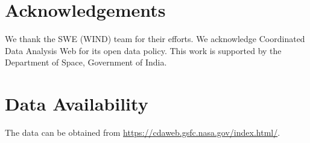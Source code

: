 \documentclass[letters,usenatbib]{mnras}
\begin{document}
\section*{Acknowledgements}

We thank the SWE (WIND) team for their efforts. We acknowledge Coordinated Data Analysis Web for its open data policy. This work is supported by the Department of Space, Government of India.

\section*{Data Availability}
The data can be obtained from \url{https://cdaweb.gsfc.nasa.gov/index.html/}.












\label{lastpage}
\end{document}
